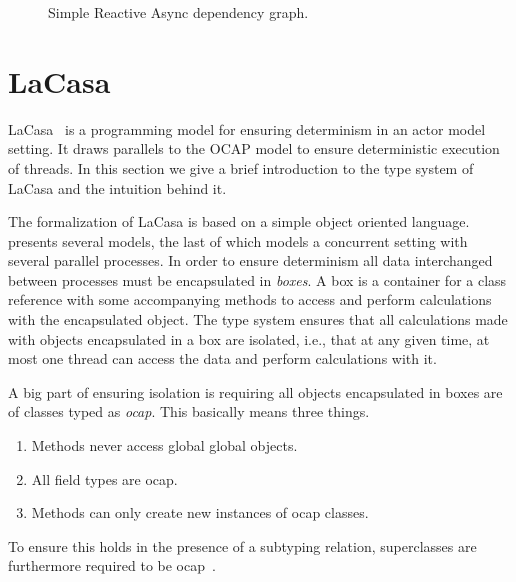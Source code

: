 
\begin{figure}
  \centering
  \caption{Simple Reactive Async dependency graph.}
  \label{fig:ra_example}
\end{figure}

\section{LaCasa}\label{sec:lacasa}

LaCasa~\parencite{conf/oopsla/HallerL16} is a programming model for ensuring
determinism in an actor model~\parencite{Hewi73a} setting. It draws
parallels to the OCAP model to ensure deterministic execution of threads. In
this section we give a brief introduction to the type system of LaCasa and the
intuition behind it.

The formalization of LaCasa is based on a simple object oriented language.
\textcite{conf/oopsla/HallerL16} presents several models, the last of which
models a concurrent setting with several parallel processes. In order to ensure
determinism all data interchanged between processes must be encapsulated in
\emph{boxes}. A box is a container for a class reference with some accompanying
methods to access and perform calculations with the encapsulated object. The
type system ensures that all calculations made with objects encapsulated in a box
are isolated, i.e., that at any given time, at most one thread can access the
data and perform calculations with it.

A big part of ensuring isolation is requiring all objects encapsulated in boxes
are of classes typed as \emph{ocap}. This basically means three things.
\begin{enumerate}
  \item Methods never access global global objects.
  \item All field types are ocap.
  \item Methods can only create new instances of ocap classes.
\end{enumerate}
To ensure this holds in the presence of a subtyping relation, superclasses are
furthermore required to be ocap~\parencite{conf/oopsla/HallerL16}.

